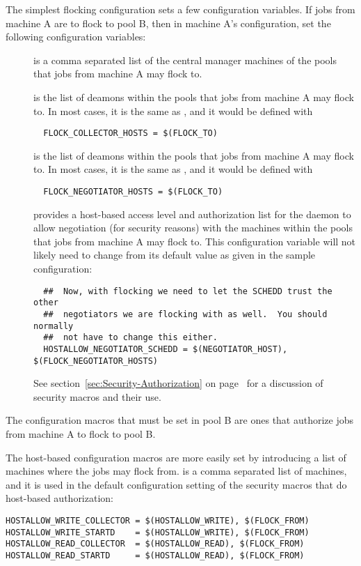 The simplest flocking configuration sets
a few configuration variables.
If jobs from machine A are to flock to pool B, 
then in machine A's configuration,
set the following configuration variables:
\begin{description}
  \item[] is a comma separated list of the central
  manager machines of the pools that jobs from machine A may flock to.
  \item[]
  is the list of  deamons within the pools
  that jobs from machine A may flock to.
  In most cases, it is the same as , and
  it would be defined with 
  \begin{verbatim}
  FLOCK_COLLECTOR_HOSTS = $(FLOCK_TO)
  \end{verbatim}
  \item[]
  is the list of  deamons within the pools
  that jobs from machine A may flock to.
  In most cases, it is the same as , and
  it would be defined with 
  \begin{verbatim}
  FLOCK_NEGOTIATOR_HOSTS = $(FLOCK_TO)
  \end{verbatim}
  \item[]
  provides a host-based access level and authorization list for the
   daemon to allow negotiation (for security
  reasons) with the machines within the pools
  that jobs from machine A may flock to.
  This configuration variable will not likely need to change
  from its default value as given in the sample configuration:
  \footnotesize
  \begin{verbatim}
  ##  Now, with flocking we need to let the SCHEDD trust the other
  ##  negotiators we are flocking with as well.  You should normally
  ##  not have to change this either.
  HOSTALLOW_NEGOTIATOR_SCHEDD = $(NEGOTIATOR_HOST), $(FLOCK_NEGOTIATOR_HOSTS)
  \end{verbatim}
  \normalsize
  See 
  section~\ref{sec:Security-Authorization} on
  page~\pageref{sec:Security-Authorization} for a discussion
  of security macros and their use.
\end{description}

The configuration macros that must be set in 
pool B are ones that authorize jobs from machine A
to flock to pool B.

The host-based configuration macros are more easily
set by introducing a list of machines where the jobs may flock from. 
 is a comma separated list of machines,
and  it is used in the default configuration setting
of the security macros that do host-based authorization:
\footnotesize
\begin{verbatim}
HOSTALLOW_WRITE_COLLECTOR = $(HOSTALLOW_WRITE), $(FLOCK_FROM)
HOSTALLOW_WRITE_STARTD    = $(HOSTALLOW_WRITE), $(FLOCK_FROM)
HOSTALLOW_READ_COLLECTOR  = $(HOSTALLOW_READ), $(FLOCK_FROM)
HOSTALLOW_READ_STARTD     = $(HOSTALLOW_READ), $(FLOCK_FROM)
\end{verbatim}
\normalsize

